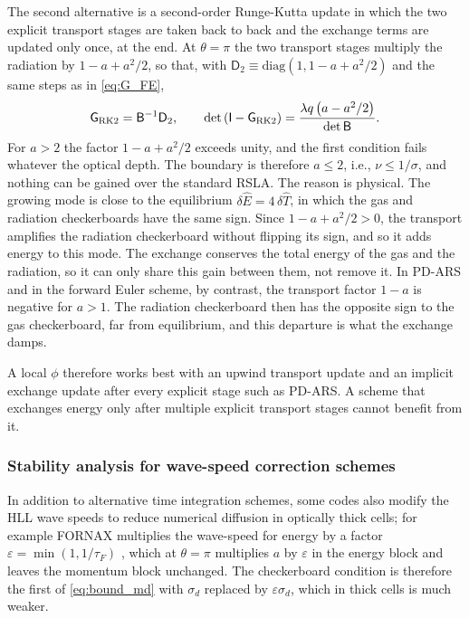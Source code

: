 \documentclass[preprint,12pt,authoryear]{elsarticle}
\newcommand{\tenI}{\mathsf{I}}
\newcommand{\tenG}{\mathsf{G}}
\providecommand{\tenD}{\mathsf{D}}
\providecommand{\tenB}{\mathsf{B}}
\newcommand{\hE}{\hat{E}}
\newcommand{\hT}{\hat{T}}
\begin{document}
The second alternative is a second-order Runge-Kutta update in which the two explicit transport stages are taken back to back and the exchange terms are updated only once, at the end. At $\theta = \pi$ the two transport stages multiply the radiation by $1 - a + a^2/2$, so that, with $\tenD_2 \equiv \mathrm{diag}(1, 1 - a + a^2/2)$ and the same steps as in \autoref{eq:G_FE},
\begin{equation}
    \tenG_{\rm RK2} = \tenB^{-1}\tenD_2,
    \qquad
    \det\left(\tenI - \tenG_{\rm RK2}\right) = \frac{\lambda q\left(a - a^2/2\right)}{\det\tenB} .
    \label{eq:G_RK2}
\end{equation}
For $a > 2$ the factor $1 - a + a^2/2$ exceeds unity, and the first condition fails whatever the optical depth. The boundary is therefore $a \leq 2$, i.e., $\nu \leq 1/\sigma$, and nothing can be gained over the standard RSLA. The reason is physical. The growing mode is close to the equilibrium $\delta\hE = 4\,\delta\hT$, in which the gas and radiation checkerboards have the same sign. Since $1 - a + a^2/2 > 0$, the transport amplifies the radiation checkerboard without flipping its sign, and so it adds energy to this mode. The exchange conserves the total energy of the gas and the radiation, so it can only share this gain between them, not remove it. In PD-ARS and in the forward Euler scheme, by contrast, the transport factor $1 - a$ is negative for $a > 1$. The radiation checkerboard then has the opposite sign to the gas checkerboard, far from equilibrium, and this departure is what the exchange damps.


A local $\phi$ therefore works best with an upwind transport update and an implicit exchange update after every explicit stage such as PD-ARS. A scheme
that exchanges energy only after multiple explicit transport stages cannot benefit from it.

\subsubsection{Stability analysis for wave-speed correction schemes}
\label{sssec:wave_speed}

In addition to alternative time integration schemes, some codes also modify the HLL wave speeds to reduce numerical diffusion in optically thick cells; for example FORNAX multiplies the wave-speed for energy by a factor $\varepsilon = \min(1, 1/\tau_F)$ \citep{Skinner19a}, which at $\theta = \pi$ multiplies $a$ by $\varepsilon$ in the energy block and leaves the momentum block unchanged. The checkerboard condition is therefore the first of \autoref{eq:bound_md} with $\sigma_d$ replaced by $\varepsilon\sigma_d$, which in thick cells is much weaker.
\end{document}
